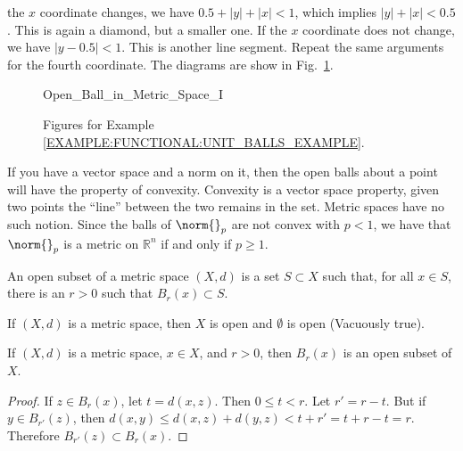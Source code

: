 \documentclass[crop=false,class=book,oneside]{standalone}
\begin{document}
\begin{example}
            the $x$ coordinate changes, we have
            $0.5+|y|+|x|<1$, which implies
            $|y|+|x|<0.5$. This is again a diamond, but a
            smaller one. If the $x$ coordinate does not
            change, we have $|y-0.5|<1$. This is another
            line segment. Repeat the same arguments for the
            fourth coordinate. The diagrams are show in
            Fig.~\ref{FUNCTIONAL:HOMEWORK:2:PROBLEM:4:FIGURES}.
        \begin{figure}[H]
            \centering
            \captionsetup{type=figure}
            
                      {Open_Ball_in_Metric_Space_I}
            \caption{Figures for Example
                     \ref{EXAMPLE:FUNCTIONAL:UNIT_BALLS_EXAMPLE}.}
            \label{FUNCTIONAL:HOMEWORK:2:PROBLEM:4:FIGURES}
        \end{figure}
            \end{example}
            If you have a vector space and a norm on it,
            then the open balls about a point will have the
            property of convexity. Convexity is a vector space
            property, given two points the ``line'' between the
            two remains in the set. Metric spaces have no such
            notion. Since the balls of $\norm{}_{p}$ are not
            convex with $p<1$, we have that $\norm{}_{p}$ is
            a metric on $\mathbb{R}^{n}$
            if and only if $p\geq{1}$.
            \begin{definition}
                An open subset of a metric space
                $(X,d)$ is a set $S\subset{X}$ such that,
                for all $x\in{S}$, there is an
                $r>0$ such that
                $B_{r}(x)\subset{S}$.
            \end{definition}
            \begin{example}
                If $(X,d)$ is a metric space, then
                $X$ is open and $\emptyset$ is open
                (Vacuously true).
            \end{example}
            \begin{theorem}
                If $(X,d)$ is a metric space, $x\in{X}$,
                and $r>0$, then $B_{r}(x)$ is an open
                subset of $X$.
            \end{theorem}
            \begin{proof}
                If $z\in{B_{r}(x)}$, let $t=d(x,z)$.
                Then $0\leq{t}<r$. Let $r'=r-t$.
                But if $y\in{B_{r'}(z)}$, then
                $d(x,y)\leq{d(x,z)+d(y,z)}<t+r'=t+r-t=r$.
                Therefore $B_{r'}(z)\subset{B_{r}(x)}$.
            \end{proof}
\end{document}
